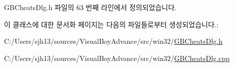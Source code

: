 G\+B\+Cheats\+Dlg.\+h 파일의 63 번째 라인에서 정의되었습니다.



이 클래스에 대한 문서화 페이지는 다음의 파일들로부터 생성되었습니다.\+:\begin{DoxyCompactItemize}
\item 
C\+:/\+Users/sjh13/sources/\+Visual\+Boy\+Advance/src/win32/\mbox{\hyperlink{_g_b_cheats_dlg_8h}{G\+B\+Cheats\+Dlg.\+h}}\item 
C\+:/\+Users/sjh13/sources/\+Visual\+Boy\+Advance/src/win32/\mbox{\hyperlink{_g_b_cheats_dlg_8cpp}{G\+B\+Cheats\+Dlg.\+cpp}}\end{DoxyCompactItemize}
